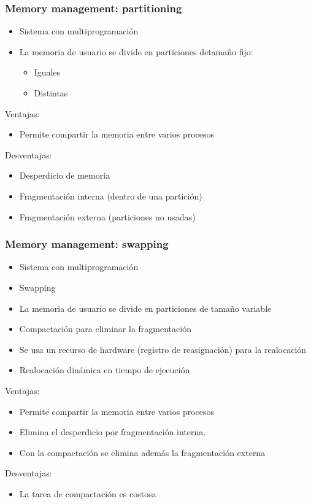\subsubsection{Memory management: partitioning}
\begin{itemize}
\item Sistema con multiprogramación
\item La memoria de usuario se divide en particiones detamaño fijo:
	\begin{itemize}
	\item Iguales
	\item Distintas
	\end{itemize}
\end{itemize}
Ventajas:
\begin{itemize}
\item Permite compartir la memoria entre varios procesos
\end{itemize}
Desventajas:
\begin{itemize}
\item Desperdicio de memoria
\item Fragmentación interna (dentro de una partición)
\item Fragmentación externa (particiones no usadas)
\end{itemize}

\subsubsection{Memory management: swapping}
\begin{itemize}
\item Sistema con multiprogramación
\item Swapping
\item La memoria de usuario se divide en particiones de tamaño variable
\item Compactación para eliminar la fragmentación
\item Se usa un recurso de hardware (registro de reasignación) para la realocación
\item Realocación dinámica en tiempo de ejecución
\end{itemize}
Ventajas:
\begin{itemize}
\item Permite compartir la memoria entre varios procesos
\item Elimina el desperdicio por fragmentación interna.
\item Con la compactación se elimina además la fragmentación externa
\end{itemize}
Desventajas:
\begin{itemize}
\item La tarea de compactación es costosa
\end{itemize}

